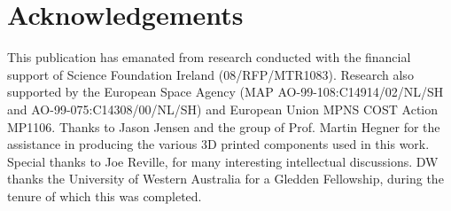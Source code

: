 \documentclass[10pt,a4paper]{article}
\begin{document}

 
\section{Acknowledgements}

This publication has emanated from research conducted with the financial support of Science Foundation Ireland (08/RFP/MTR1083). Research also supported by the European Space Agency (MAP AO-99-108:C14914/02/NL/SH and AO-99-075:C14308/00/NL/SH) and European Union MPNS COST Action MP1106. Thanks to Jason Jensen and the group of Prof. Martin Hegner for the assistance in producing the various 3D printed components used in this work. Special thanks to Joe Reville, for many interesting intellectual discussions. DW thanks the University of Western Australia for a Gledden Fellowship, during the tenure of which this was completed.





\end{document}
